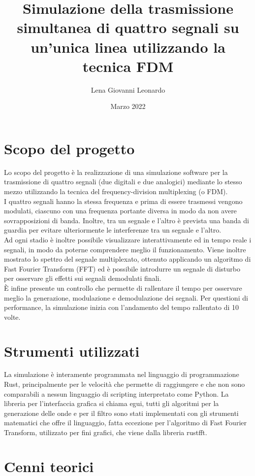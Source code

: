 \documentclass{article}
\title{Simulazione della trasmissione simultanea di quattro segnali su un'unica linea utilizzando la tecnica FDM}
\author{Lena Giovanni Leonardo}
\date{Marzo 2022}
\begin{document}
\maketitle

\section{Scopo del progetto}
Lo scopo del progetto è la realizzazione di una simulazione software per la trasmissione di quattro segnali (due digitali
e due analogici) mediante lo stesso mezzo utilizzando la tecnica del frequency-division multiplexing (o FDM).\\
I quattro segnali hanno la stessa frequenza e prima di essere trasmessi vengono modulati, ciascuno con una frequenza
portante diversa in modo da non avere sovrapposizioni di banda. Inoltre, tra un segnale e l'altro è prevista una
banda di guardia per evitare ulteriormente le interferenze tra un segnale e l'altro.\\
Ad ogni stadio è inoltre possibile visualizzare interattivamente ed in tempo reale i segnali, in modo da poterne comprendere
meglio il funzionamento. Viene inoltre mostrato lo spettro del segnale multiplexato, ottenuto applicando un algoritmo di
Fast Fourier Transform (FFT) ed è possibile introdurre un segnale di disturbo per osservare gli effetti sui segnali demodulati
finali.\\
È infine presente un controllo che permette di rallentare il tempo per osservare meglio la generazione, modulazione e demodulazione
dei segnali. Per questioni di performance, la simulazione inizia con l'andamento del tempo rallentato di 10 volte.

\section{Strumenti utilizzati}
La simulazione è interamente programmata nel linguaggio di programmazione Rust, principalmente per le velocità che
permette di raggiungere e che non sono comparabili a nessun linguaggio di scripting interpretato come Python. La libreria
per l'interfaccia grafica si chiama egui, tutti gli algoritmi per la generazione delle onde e per il filtro sono stati
implementati con gli strumenti matematici che offre il linguaggio, fatta eccezione per l'algoritmo di Fast Fourier Transform,
utilizzato per fini grafici, che viene dalla libreria rustfft.

\section{Cenni teorici}
\end{document}

